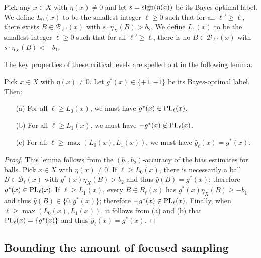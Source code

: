 \documentclass[anon,12pt]{colt2022} %
\def\B{{\mathcal B}}
\def\yh{{\widehat{y}}}
\def\sign{{\rm sign}}
\def\PL{{\mbox{\rm PL}}}
\begin{document}
\begin{definition}
Pick any $x \in X$ with $\eta(x) \neq 0$ and let $s = \sign(\eta(x))$ be its Bayes-optimal label. We define $L_0(x)$ to be the smallest integer $\ell \geq 0$ such that for all $\ell' \geq \ell$, there exists $B \in \B_{\ell'}(x)$ with $s \cdot \eta_X(B) > b_2$. We define $L_1(x)$ to be the smallest integer $\ell \geq 0$ such that for all $\ell' \geq \ell$, there is no $B \in \B_{\ell'}(x)$ with $s \cdot \eta_X(B) < -b_1$.
\label{defn:L01}
\end{definition}

The key properties of these critical levels are spelled out in the following lemma.
\begin{lemma}
Pick $x \in X$ with $\eta(x) \neq 0$. Let $g^*(x) \in \{+1,-1\}$ be its Bayes-optimal label. Then:
\begin{enumerate}
\item[(a)] For all $\ell \geq L_0(x)$, we must have $g^*(x) \in \PL_\ell(x)$.
\item[(b)] For all $\ell \geq L_1(x)$, we must have $-g^*(x) \not\in \PL_\ell(x)$.
\item[(c)] For all $\ell \geq \max(L_0(x), L_1(x))$, we must have $\yh_\ell(x) = g^*(x)$.
\end{enumerate}
\label{lemma:boundary}
\end{lemma}
\begin{proof}
This lemma follows from the $(b_1, b_2)$-accuracy of the bias estimates for balls. Pick $x \in X$ with $\eta(x) \neq 0$. If $\ell \geq L_0(x)$, there is necessarily a ball $B \in \B_\ell(x)$ with $g^*(x) \eta_X(B) > b_2$ and thus $\yh(B) = g^*(x)$; therefore $g^*(x) \in \PL_\ell(x)$. If $\ell \geq L_1(x)$, every $B \in B_\ell(x)$ has $g^*(x) \eta_X(B) \geq -b_1$ and thus $\yh(B) \in \{0,g^*(x)\}$; therefore $-g^*(x) \not\in \PL_\ell(x)$. Finally, when $\ell \geq \max(L_0(x), L_1(x))$, it follows from (a) and (b) that $\PL_\ell(x) = \{g^*(x)\}$ and thus $\yh_\ell(x) = g^*(x)$.
\end{proof}

\subsection{Bounding the amount of focused sampling}
\end{document}
